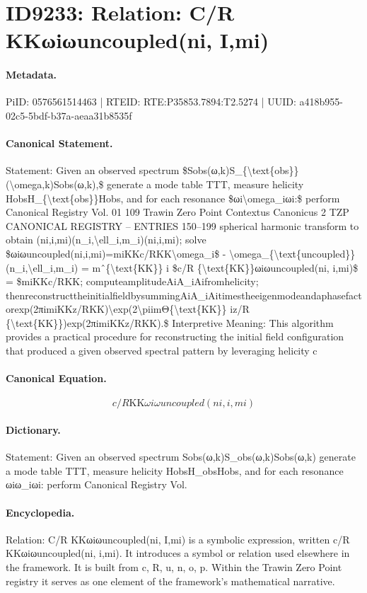 \section*{ID9233: Relation: C/R KKωiωuncoupled(ni, I,mi)}
\paragraph{Metadata.}
PiID: 0576561514463 | RTEID: RTE:P35853.7894:T2.5274 | UUID: a418b955-02c5-5bdf-b37a-aeaa31b8535f

\paragraph{Canonical Statement.}
Statement: Given an observed spectrum \$Sobs(ω,k)S\_\{\textbackslash{}text\{obs\}\}(\textbackslash{}omega,k)Sobs(ω,k),\$ generate a mode table TTT, measure helicity HobsH\_\{\textbackslash{}text\{obs\}\}Hobs, and for each resonance \$ωi\textbackslash{}omega\_iωi:\$ perform Canonical Registry Vol. 01 109 Trawin Zero Point Contextus Canonicus 2 TZP CANONICAL REGISTRY – ENTRIES 150–199 spherical harmonic transform to obtain (ni,i,mi)(n\_i,\textbackslash{}ell\_i,m\_i)(ni,i,mi); solve \$ωiωuncoupled(ni,i,mi)=miKKc/RKK\textbackslash{}omega\_i\$ - \textbackslash{}omega\_\{\textbackslash{}text\{uncoupled\}\}(n\_i,\textbackslash{}ell\_i,m\_i) = mˆ\{\textbackslash{}text\{KK\}\} i \$c/R \{\textbackslash{}text\{KK\}\}ωiωuncoupled(ni, i,mi)\$ = \$miKKc/RKK; computeamplitudeAiA\_iAifromhelicity; thenreconstructtheinitialfieldbysummingAiA\_iAitimestheeigenmodeandaphasefactorexp(2πimiKKz/RKK)\textbackslash{}exp(2\textbackslash{}piimΘ\{\textbackslash{}text\{KK\}\} iz/R \{\textbackslash{}text\{KK\}\})exp(2πimiKKz/RKK).\$ Interpretive Meaning: This algorithm provides a practical procedure for reconstructing the initial field configuration that produced a given observed spectral pattern by leveraging helicity c

\paragraph{Canonical Equation.}
\[
c/R {\text{KK}}ωiωuncoupled(ni, i,mi)
\]

\paragraph{Dictionary.}
Statement: Given an observed spectrum Sobs(ω,k)S\_obs(ω,k)Sobs(ω,k) generate a mode table TTT, measure helicity HobsH\_obsHobs, and for each resonance ωiω\_iωi: perform Canonical Registry Vol.

\paragraph{Encyclopedia.}
Relation: C/R KKωiωuncoupled(ni, I,mi) is a symbolic expression, written c/R KKωiωuncoupled(ni, i,mi). It introduces a symbol or relation used elsewhere in the framework. It is built from c, R, u, n, o, p. Within the Trawin Zero Point registry it serves as one element of the framework's mathematical narrative.
